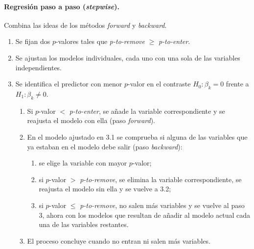 \paragraph{Regresión paso a paso (\emph{stepwise}).} Combina las ideas de los métodos
\emph{forward} y \emph{backward}.
\begin{enumerate}
  \item Se fijan dos $p$-valores tales que \emph{p-to-remove} $\ge$ \emph{p-to-enter}.
  \item Se ajustan los modelos individuales, cada uno con una sola de las variables
    independientes.
  \item Se identifica el predictor con menor $p$-valor en el contraste $H_0\colon\beta_k=0$ frente
    a $H_1\colon\beta_k\neq0$.
    \begin{enumerate}[label=3.\arabic*.]
      \item Si $p$-valor $<$ \emph{p-to-enter}, se añade la variable correspondiente y se reajusta
        el modelo con ella (paso \emph{forward}).
      \item En el modelo ajustado en 3.1 se comprueba si alguna de las variables que ya estaban en
        el modelo debe salir (paso \emph{backward}):
        \begin{enumerate}[label=3.2.\arabic*.]
          \item se elige la variable con mayor $p$-valor;
          \item si $p$-valor $>$ \emph{p-to-remove}, se elimina la variable correspondiente, se
            reajusta el modelo sin ella y se vuelve a 3.2;
          \item si $p$-valor $\le$ \emph{p-to-remove}, no salen más variables y se vuelve al
            paso 3, ahora con los modelos que resultan de añadir al modelo actual cada una de las
            variables restantes.
        \end{enumerate}
      \item El proceso concluye cuando no entran ni salen más variables.
    \end{enumerate}
\end{enumerate}
